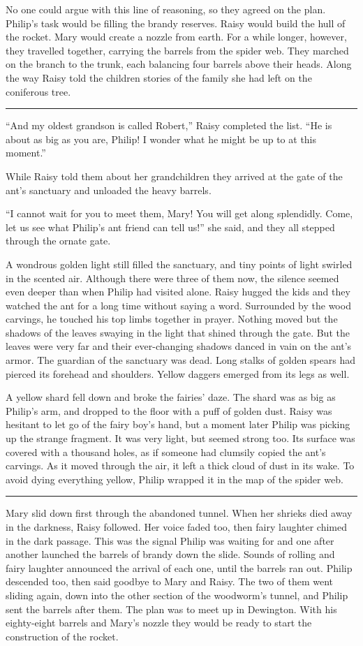 \documentclass[10pt, draft]{memoir}
\renewcommand{\pfbreakdisplay}{\bigskip \ding{166} \bigskip}
\newcommand{\secbreak}{\fancybreak{\pfbreakdisplay}}
\begin{document}
No one could argue with this line of reasoning, so they agreed on the plan.
Philip's task would be filling the brandy reserves. Raisy would build the hull
of the rocket. Mary would create a nozzle from earth. For a while longer,
however, they travelled together, carrying the barrels from the spider web.
They marched on the branch to the trunk, each balancing four barrels above
their heads. Along the way Raisy told the children stories of the family she
had left on the coniferous tree.

\secbreak

``And my oldest grandson is called Robert,'' Raisy completed the list. ``He is
about as big as you are, Philip! I wonder what he might be up to at this
moment.''

While Raisy told them about her grandchildren they arrived at the gate of the
ant's sanctuary and unloaded the heavy barrels.

``I cannot wait for you to meet them, Mary! You will get along splendidly.
Come, let us see what Philip's ant friend can tell us!'' she said, and they all
stepped through the ornate gate.

A wondrous golden light still filled the sanctuary, and tiny points of light
swirled in the scented air. Although there were three of them now, the silence
seemed even deeper than when Philip had visited alone. Raisy hugged the kids
and they watched the ant for a long time without saying a word. Surrounded by
the wood carvings, he touched his top limbs together in prayer. Nothing moved
but the shadows of the leaves swaying in the light that shined through the
gate. But the leaves were very far and their ever-changing shadows danced in
vain on the ant's armor. The guardian of the sanctuary was dead. Long stalks of
golden spears had pierced its forehead and shoulders. Yellow daggers emerged
from its legs as well.

A yellow shard fell down and broke the fairies' daze. The shard was as big as
Philip's arm, and dropped to the floor with a puff of golden dust. Raisy was
hesitant to let go of the fairy boy's hand, but a moment later Philip was
picking up the strange fragment. It was very light, but seemed strong too. Its
surface was covered with a thousand holes, as if someone had clumsily copied
the ant's carvings. As it moved through the air, it left a thick cloud of dust
in its wake. To avoid dying everything yellow, Philip wrapped it in the map of
the spider web.

\secbreak

Mary slid down first through the abandoned tunnel. When her shrieks died away
in the darkness, Raisy followed. Her voice faded too, then fairy laughter
chimed in the dark passage. This was the signal Philip was waiting for and one
after another launched the barrels of brandy down the slide. Sounds of rolling
and fairy laughter announced the arrival of each one, until the barrels ran
out. Philip descended too, then said goodbye to Mary and Raisy. The two of them
went sliding again, down into the other section of the woodworm's tunnel, and
Philip sent the barrels after them. The plan was to meet up in Dewington. With
his eighty-eight barrels and Mary's nozzle they would be ready to start the
construction of the rocket.
\end{document}
